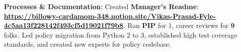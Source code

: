 \documentclass[letterpaper,11pt]{article}
\newcommand{\resumeItem}[2]{
  \item\small{
    \textbf{#1}{: #2 \vspace{-2pt}}
  }
}
\begin{document}
            \resumeItem{Processes \& Documentation}
            {Created \textbf{Manager's Readme}: \href{https://billowy-cardamom-348.notion.site/Vikas-Prasad-Fyle-4c5aa13f228142f493cf5d19021f79b8}{\textbf{https://billowy-cardamom-348.notion.site/Vikas-Prasad-Fyle-4c5aa13f228142f493cf5d19021f79b8}}. Ran \textbf{PIP} for 1, career reviews for \textbf{9} folks. Led policy migration from Python 2 to 3, established high test coverage standards, and created new experts for policy codebase.}
\end{document}
